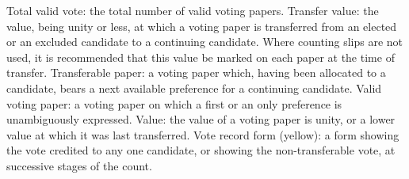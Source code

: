 Total valid vote: the total number of valid voting papers.
Transfer value: the value, being unity or less, at which a voting paper is transferred from an elected or an excluded candidate to a continuing candidate. Where counting slips are not used, it is recommended that this value be marked on each paper at the time of transfer.
Transferable paper: a voting paper which, having been allocated to a candidate, bears a next available preference for a continuing candidate.
Valid voting paper: a voting paper on which a first or an only preference is unambiguously expressed.
Value: the value of a voting paper is unity, or a lower value at which it was last transferred.
Vote record form (yellow): a form showing the vote credited to any one candidate, or showing the non-transferable vote, at successive stages of the count.


